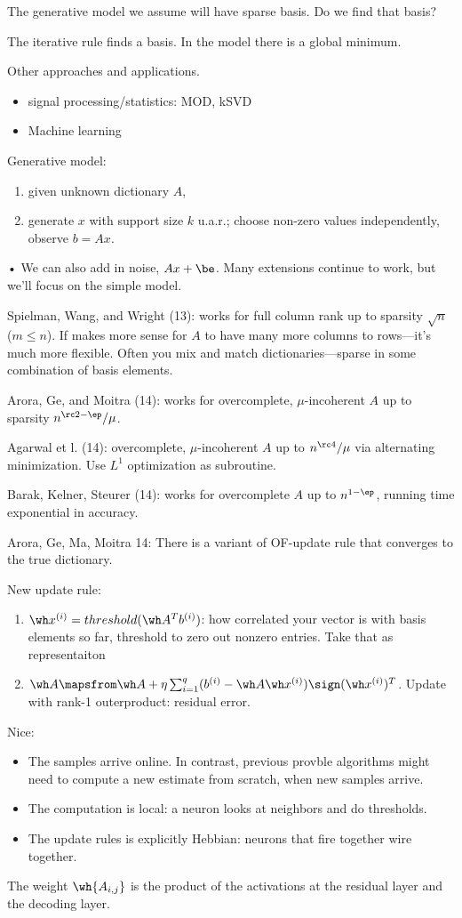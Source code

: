 The generative model we assume will have sparse basis. Do we find that basis? 

The iterative rule finds a basis. In the model there is a global minimum. 

Other approaches and applications.
\begin{itemize}
\item
signal processing/statistics: MOD, kSVD
\item
Machine learning
\end{itemize}

Generative model: 
\begin{enumerate}
\item
given unknown dictionary $A$,
\item
generate $x$ with support size $k$ u.a.r.; choose non-zero values independently, observe $b=Ax$. 
\end{enumerate}•
We can also add in noise, $Ax+\be$. Many extensions continue to work, but we'll focus on the simple model.

Spielman, Wang, and Wright (13): works for full column rank up to sparsity $\sqrt n$ ($m\le n$). If makes more sense for $A$ to have many more columns to rows---it's much more flexible. Often you mix and match dictionaries---sparse in some combination of basis elements.

Arora, Ge, and Moitra (14): works for overcomplete, $\mu$-incoherent $A$ up to sparsity $n^{\rc2-\ep}/\mu$. 

Agarwal et l. (14): overcomplete, $\mu$-incoherent $A$ up to $n^{\rc 4}/\mu$ via alternating minimization. Use $L^1$ optimization as subroutine.

Barak, Kelner, Steurer (14): works for overcomplete $A$ up to $n^{1-\ep}$, running time exponential in accuracy.

Arora, Ge, Ma, Moitra 14: There is a variant of OF-update rule that converges to the true dictionary.

New update rule:
\begin{enumerate}
\item
$\wh x^{(i)} = threshold(\wh A^Tb^{(i)})$: how correlated your vector is with basis elements so far, threshold to zero out nonzero entries. Take that as representaiton
\item
$\wh A\mapsfrom \wh A + \eta \sum_{i=1}^q (b^{(i)}-\wh A\wh x^{(i)})\sign (\wh x^{(i)})^T$. Update with rank-1 outerproduct: residual error.
\end{enumerate}
Nice:
\begin{itemize}
\item
The samples arrive online. In contrast, previous provble algorithms might need to compute a new estimate from scratch, when new samples arrive. 
\item
The computation is local: a neuron looks at neighbors and do thresholds.
\item
The update rules is explicitly Hebbian: neurons that fire together wire together.
\end{itemize}
The weight $\wh{A_{i,j}}$ is the product of the activations at the residual layer and the decoding layer. 

